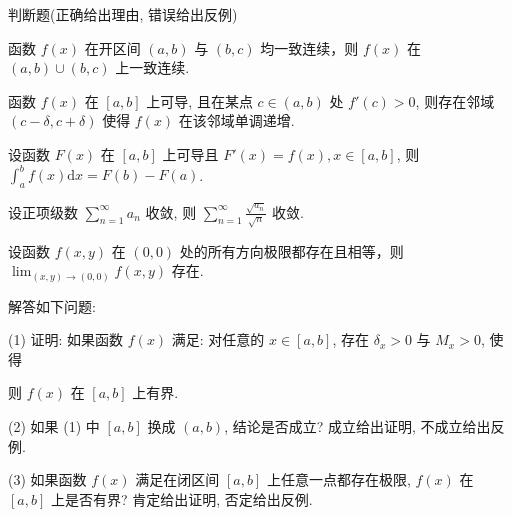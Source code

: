 \par{}
判断题(正确给出理由, 错误给出反例)\par
函数 $f(x)$ 在开区间 $(a, b)$ 与 $(b, c)$ 均一致连续，则 $f(x)$ 在 $(a, b) \cup (b, c)$ 上一致连续.\par
函数 $f(x)$ 在 $[a, b]$ 上可导, 且在某点 $c \in (a, b)$ 处 $f'(c) > 0$, 则存在邻域 $(c - \delta, c + \delta)$ 使得 $f(x)$ 在该邻域单调递增.\par
设函数 $F(x)$ 在 $[a, b]$ 上可导且 $F'(x) = f(x), x \in [a, b]$, 则 $\int_{a}^{b} f(x) \mathrm{d}x = F(b) - F(a)$.\par
设正项级数 $\sum_{n=1}^{\infty} a_n$ 收敛, 则 $\sum_{n=1}^{\infty} \frac{\sqrt{a_n}}{\sqrt{n}}$ 收敛.\par
设函数 $f(x, y)$ 在 $(0, 0)$ 处的所有方向极限都存在且相等，则 $\lim_{(x, y) \to (0, 0)} f(x, y)$ 存在.\par
\par{}
解答如下问题:\par
\par{}
(1) 证明: 如果函数 $f(x)$ 满足: 对任意的 $x \in [a, b]$, 存在 $\delta_x > 0$ 与 $M_x > 0$, 使得\par
\nopagebreak[4]
则 $f(x)$ 在 $[a,b]$ 上有界.\par
(2) 如果 (1) 中 $[a, b]$ 换成 $(a, b)$, 结论是否成立? 成立给出证明, 不成立给出反例.\par
(3) 如果函数 $f(x)$ 满足在闭区间 $[a, b]$ 上任意一点都存在极限, $f(x)$ 在 $[a, b]$ 上是否有界? 肯定给出证明, 否定给出反例.\par
